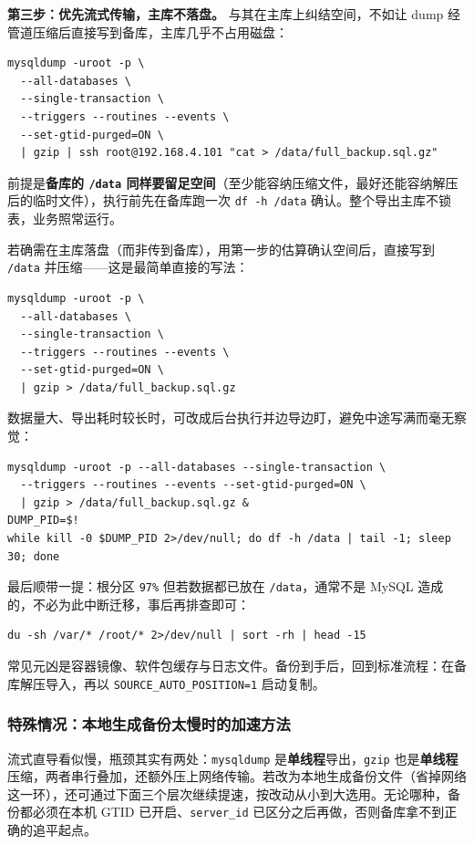 \documentclass[12pt,UTF8]{ctexbook}
\begin{document}
\textbf{第三步：优先流式传输，主库不落盘。} 与其在主库上纠结空间，不如让 dump 经管道压缩后直接写到备库，主库几乎不占用磁盘：

\begin{lstlisting}
mysqldump -uroot -p \
  --all-databases \
  --single-transaction \
  --triggers --routines --events \
  --set-gtid-purged=ON \
  | gzip | ssh root@192.168.4.101 "cat > /data/full_backup.sql.gz"
\end{lstlisting}

前提是\textbf{备库的 \texttt{/data} 同样要留足空间}（至少能容纳压缩文件，最好还能容纳解压后的临时文件），执行前先在备库跑一次 \texttt{df -h /data} 确认。整个导出主库不锁表，业务照常运行。

若确需在主库落盘（而非传到备库），用第一步的估算确认空间后，直接写到 \texttt{/data} 并压缩——这是最简单直接的写法：

\begin{lstlisting}
mysqldump -uroot -p \
  --all-databases \
  --single-transaction \
  --triggers --routines --events \
  --set-gtid-purged=ON \
  | gzip > /data/full_backup.sql.gz
\end{lstlisting}

数据量大、导出耗时较长时，可改成后台执行并边导边盯，避免中途写满而毫无察觉：

\begin{lstlisting}
mysqldump -uroot -p --all-databases --single-transaction \
  --triggers --routines --events --set-gtid-purged=ON \
  | gzip > /data/full_backup.sql.gz &
DUMP_PID=$!
while kill -0 $DUMP_PID 2>/dev/null; do df -h /data | tail -1; sleep 30; done
\end{lstlisting}

最后顺带一提：根分区 \texttt{97\%} 但若数据都已放在 \texttt{/data}，通常不是 MySQL 造成的，不必为此中断迁移，事后再排查即可：

\begin{lstlisting}
du -sh /var/* /root/* 2>/dev/null | sort -rh | head -15
\end{lstlisting}

常见元凶是容器镜像、软件包缓存与日志文件。备份到手后，回到标准流程：在备库解压导入，再以 \texttt{SOURCE\_AUTO\_POSITION=1} 启动复制。

\subsubsection{特殊情况：本地生成备份太慢时的加速方法}

流式直导看似慢，瓶颈其实有两处：\texttt{mysqldump} 是\textbf{单线程}导出，\texttt{gzip} 也是\textbf{单线程}压缩，两者串行叠加，还额外压上网络传输。若改为本地生成备份文件（省掉网络这一环），还可通过下面三个层次继续提速，按改动从小到大选用。无论哪种，备份都必须在本机 GTID 已开启、\texttt{server\_id} 已区分之后再做，否则备库拿不到正确的追平起点。
\end{document}

